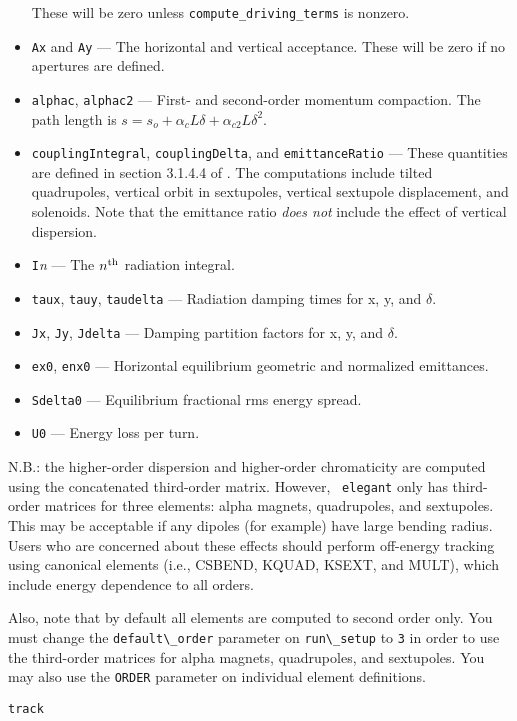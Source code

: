\documentclass[11pt]{article}
\begin{document}
\begin{itemize}
 These will be zero unless \verb|compute_driving_terms| is nonzero.
\item {\tt Ax} and {\tt Ay} --- The horizontal and vertical acceptance.  These will be zero if no apertures are
  defined.
\item {\tt alphac}, {\tt alphac2} --- First- and second-order momentum compaction.  The path length is 
  $s = s_o + \alpha_c L \delta + \alpha_{c2} L \delta^2$.
\item {\tt couplingIntegral}, {\tt couplingDelta}, and {\tt emittanceRatio} --- These quantities are defined
  in section 3.1.4.4 of \cite{HAPE}.  The computations include tilted quadrupoles, vertical orbit in sextupoles,
  vertical sextupole displacement, and solenoids.  Note that the emittance ratio {\em does not} include 
  the effect of vertical dispersion.
\item {\tt I}{\em n} --- The $n^{\rm th}$ radiation integral.
\item {\tt taux}, {\tt tauy}, {\tt taudelta} --- Radiation damping times for x, y, and $\delta$.
\item {\tt Jx}, {\tt Jy}, {\tt Jdelta} --- Damping partition factors for  x, y, and $\delta$.
\item {\tt ex0}, {\tt enx0} --- Horizontal equilibrium geometric and normalized emittances.
\item {\tt Sdelta0} --- Equilibrium fractional rms energy spread.
\item {\tt U0} --- Energy loss per turn.
\end{itemize}

N.B.: the higher-order dispersion and higher-order chromaticity are
computed using the concatenated third-order matrix.  However, {\tt
elegant} only has third-order matrices for three elements:
alpha magnets, quadrupoles, and sextupoles.  This may be acceptable if
any dipoles (for example) have large bending radius.  Users who are
concerned about these effects should perform off-energy tracking using
canonical elements (i.e., CSBEND, KQUAD, KSEXT, and MULT), which
include energy dependence to all orders.

Also, note that by default all elements are computed to second order
only.  You must change the \verb|default\_order| parameter on
\verb|run\_setup| to \verb|3| in order to use the third-order matrices
for alpha magnets, quadrupoles, and sextupoles.  You may also use the
{\tt ORDER} parameter on individual element definitions.

\begin{latexonly}
\newpage
\begin{center}{\Large\verb|track|}\end{center}
\end{latexonly}
\end{document}
